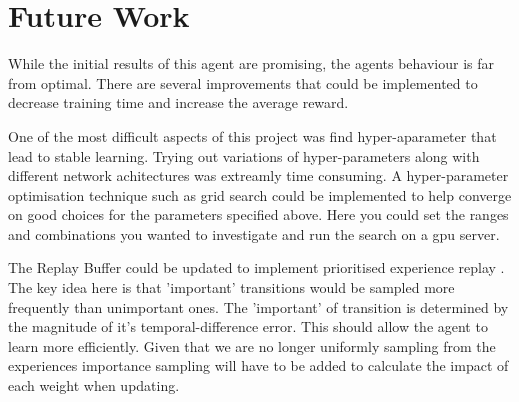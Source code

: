 \documentclass[12pt]{article}
\begin{document}
\section{Future Work}
While the initial results of this agent are promising, the agents behaviour is far from optimal.
There are several improvements that could be implemented to decrease training time and increase the average reward.

One of the most difficult aspects of this project was find hyper-aparameter that lead to stable learning.
Trying out variations of hyper-parameters along with different network achitectures was extreamly time consuming.
A hyper-parameter optimisation technique such as grid search could be implemented to help converge on good choices for the parameters 
specified above. 
Here you could set the ranges and combinations you wanted to investigate and run the search on a gpu server.

The Replay Buffer could be updated to implement prioritised experience replay \cite{per_paper}. 
The key idea here is that 'important' transitions would be sampled more frequently than unimportant ones. 
The 'important' of transition is determined by the magnitude of it's temporal-difference error.
This should allow the agent to learn more efficiently. 
Given that we are no longer uniformly sampling from the experiences importance sampling will have to be added to calculate the impact of each weight when updating.

\printbibliography
\end{document}
